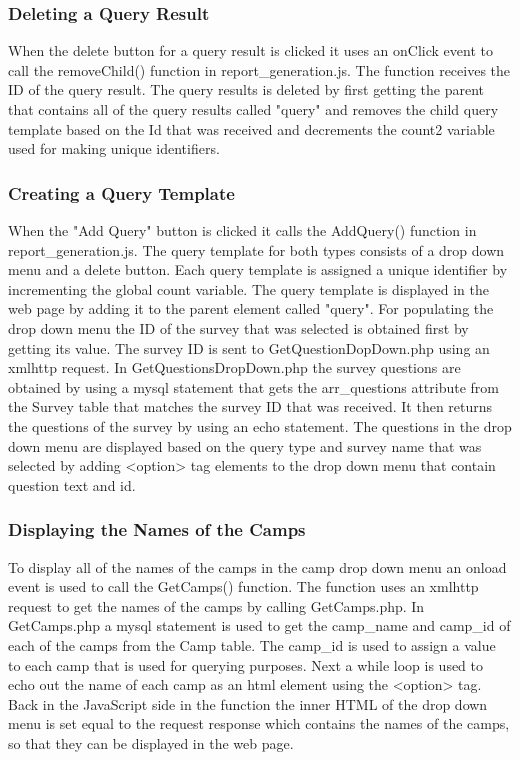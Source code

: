 \documentclass[../final.tex]{subfiles}
\begin{document}
	\subsubsection{Deleting a Query Result}
	When the delete button for a query result is clicked it uses an onClick event to call the removeChild() function in report\_generation.js. The function receives the ID of the query result. The query results is deleted by first getting the parent that contains all of the query results called "query" and removes the child query template based on the Id that was received and decrements the count2 variable used for making unique identifiers. 
	\subsubsection{Creating a Query Template} 
	When the "Add Query" button is clicked it calls the AddQuery() function in report\_generation.js. The query template for both types consists of a drop down menu and a delete button. Each query template is assigned a unique identifier by incrementing the global count variable. The query template is displayed in the web page by adding it to the parent element called "query". For populating the drop down menu the ID of the survey that was selected is obtained first by getting its value. The survey ID is sent to GetQuestionDopDown.php using an xmlhttp request. In GetQuestionsDropDown.php the survey questions are obtained by using a mysql statement that gets the arr\_questions attribute from the Survey table that matches the survey ID that was received. It then returns the questions of the survey by using an echo statement. The questions in the drop down menu are displayed based on the query type and survey name that was selected by adding <option> tag elements to the drop down menu that contain question text and id. 
	\subsubsection{Displaying the Names of the Camps}
	To display all of the names of the camps in the camp drop down menu an onload event is used to call the GetCamps() function. The function uses an xmlhttp request to get the names of the camps by calling GetCamps.php. In GetCamps.php a mysql statement is used to get the camp\_name and camp\_id of each of the camps from the Camp table. The camp\_id is used to assign a value to each camp that is used for querying purposes. Next a while loop is used to echo out the name of each camp as an html element using the <option> tag. Back in the JavaScript side in the function the inner HTML of the drop down menu is set equal to the request response which contains the names of the camps, so that they can be displayed in the web page.
\end{document}
